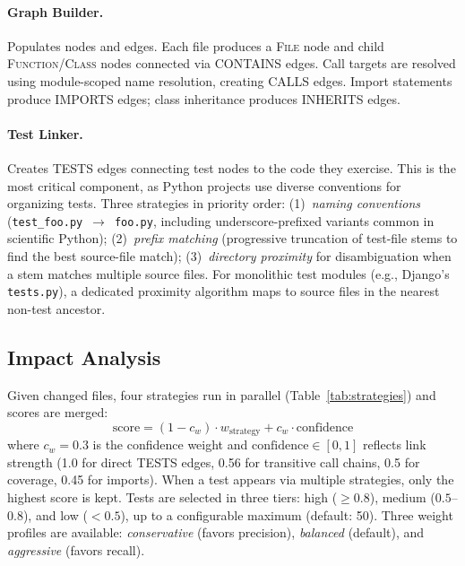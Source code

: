 \documentclass[sigconf,nonacm]{acmart}
\begin{document}
\paragraph{Graph Builder.}
Populates nodes and edges.  Each file produces a \textsc{File} node and child
\textsc{Function}/\textsc{Class} nodes connected via \textsc{CONTAINS} edges.
Call targets are resolved using module-scoped name resolution, creating
\textsc{CALLS} edges.  Import statements produce \textsc{IMPORTS} edges;
class inheritance produces \textsc{INHERITS} edges.

\paragraph{Test Linker.}
Creates \textsc{TESTS} edges connecting test nodes to the code they
exercise.  This is the most critical component, as Python projects use
diverse conventions for organizing tests.  Three strategies in priority
order:
(1)~\emph{naming conventions}
(\texttt{test\_foo.py}~$\to$~\texttt{foo.py}, including
underscore-prefixed variants common in scientific Python);
(2)~\emph{prefix matching} (progressive truncation of test-file stems
to find the best source-file match);
(3)~\emph{directory proximity} for disambiguation when a stem matches
multiple source files.  For monolithic test modules
(e.g., Django's \texttt{tests.py}), a dedicated proximity algorithm
maps to source files in the nearest non-test ancestor.

\subsection{Impact Analysis}

Given changed files, four strategies run in parallel
(Table~\ref{tab:strategies}) and scores are merged:
\begin{equation}
  \text{score} = (1 - c_w) \cdot w_{\text{strategy}} + c_w \cdot
  \text{confidence}
  \label{eq:score}
\end{equation}
where $c_w = 0.3$ is the confidence weight and $\text{confidence} \in [0,1]$
reflects link strength (1.0 for direct \textsc{TESTS} edges, 0.56 for
transitive call chains, 0.5 for coverage, 0.45 for imports).  When a test
appears via multiple strategies, only the highest score is kept.  Tests are
selected in three tiers: high ($\geq 0.8$), medium ($0.5$--$0.8$), and low
($< 0.5$), up to a configurable maximum (default: 50).  Three weight profiles
are available: \emph{conservative} (favors precision), \emph{balanced}
(default), and \emph{aggressive} (favors recall).
\end{document}
